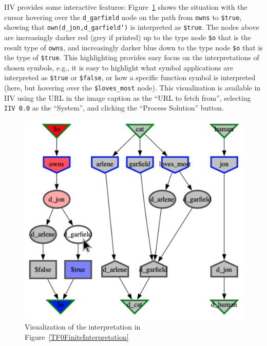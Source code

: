 \documentclass[letterpaper]{article}
\newcommand{\smalltt}[1]{\small \texttt{#1}}
\begin{document}
{IIV provides some interactive features: Figure~\ref{TF0FiniteIIV} shows the situation with the 
cursor hovering over the {\smalltt{d\_garfield}} node on the path from {\smalltt{owns}} to 
{\smalltt{\$true}}, showing that {\smalltt{own(d\_jon,d\_garfield`)}} is interpreted as 
{\smalltt{\$true}}.
The nodes above are increasingly darker red (grey if printed) up to the type node {\smalltt{\$o}} 
that is the result type of {\smalltt{owns}}, and increasingly darker blue down to the type node 
{\smalltt{\$o}} that is the type of {\smalltt{\$true}}.
This highlighting provides easy focus on the interpretations of chosen symbols, e.g., it is easy
to highlight what symbol applications are interpreted as {\smalltt{\$true}} or {\smalltt{\$false}},
or how a specific function symbol is interpreted (here, but hovering over the 
{\smalltt{\$loves\_most}} node).
This visualization is available in IIV using the URL in the image caption
as the ``URL to fetch from'',
selecting {\tt IIV 0.0} as the ``System'', and clicking the ``Process Solution'' button.

\begin{figure}[htbp]
\centering
\includegraphics[width=\columnwidth]{IIVGraph.pdf}
\caption{Visualization of the interpretation in Figure~\ref{TF0FiniteInterpretation}}
\label{TF0FiniteIIV}
\end{figure}

}
\end{document}
